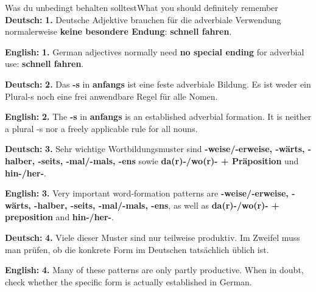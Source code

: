 \documentclass[a4paper,11pt]{article}
\newcommand{\GermanText}[1]{\textbf{Deutsch: }#1\par}
\newcommand{\EnglishText}[1]{{\small\color{SoftGray}\textbf{English: }#1\par}}
\begin{document}
\begin{grammarentry}{Was du unbedingt behalten solltest}{What you should definitely remember}
\GermanText{\textbf{1.} Deutsche Adjektive brauchen für die adverbiale Verwendung normalerweise \textbf{keine besondere Endung}: \textbf{schnell fahren}.}
\EnglishText{\textbf{1.} German adjectives normally need \textbf{no special ending} for adverbial use: \textbf{schnell fahren}.}

\GermanText{\textbf{2.} Das \textbf{-s} in \textbf{anfangs} ist eine feste adverbiale Bildung. Es ist weder ein Plural-s noch eine frei anwendbare Regel für alle Nomen.}
\EnglishText{\textbf{2.} The \textbf{-s} in \textbf{anfangs} is an established adverbial formation. It is neither a plural -s nor a freely applicable rule for all nouns.}

\GermanText{\textbf{3.} Sehr wichtige Wortbildungsmuster sind \textbf{-weise/-erweise, -wärts, -halber, -seits, -mal/-mals, -ens} sowie \textbf{da(r)-/wo(r)- + Präposition} und \textbf{hin-/her-}.}
\EnglishText{\textbf{3.} Very important word-formation patterns are \textbf{-weise/-erweise, -wärts, -halber, -seits, -mal/-mals, -ens}, as well as \textbf{da(r)-/wo(r)- + preposition} and \textbf{hin-/her-}.}

\GermanText{\textbf{4.} Viele dieser Muster sind nur teilweise produktiv. Im Zweifel muss man prüfen, ob die konkrete Form im Deutschen tatsächlich üblich ist.}
\EnglishText{\textbf{4.} Many of these patterns are only partly productive. When in doubt, check whether the specific form is actually established in German.}
\end{grammarentry}
\end{document}
